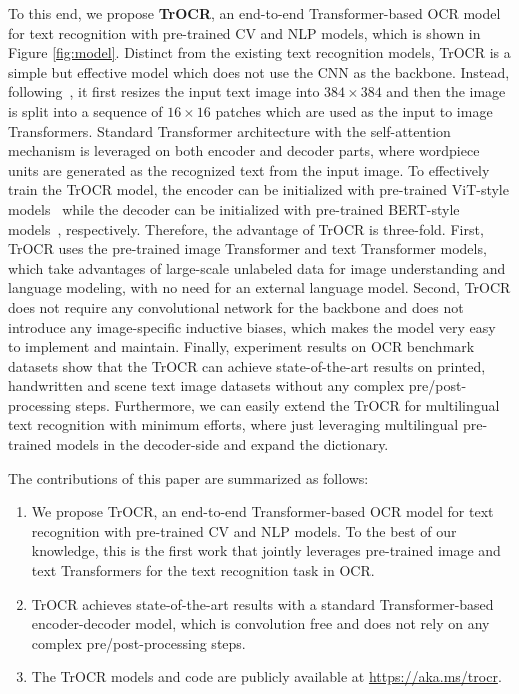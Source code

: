 \documentclass[letterpaper]{article} \usepackage{aaai23}  \usepackage{times}  \usepackage{helvet}  \usepackage{courier}  \usepackage[hyphens]{url}  \usepackage{graphicx} \urlstyle{rm} \def\UrlFont{\rm}  \usepackage{natbib}  \usepackage{caption} \frenchspacing  \setlength{\pdfpagewidth}{8.5in} \setlength{\pdfpageheight}{11in} \usepackage{algorithm}
\begin{document}
To this end, we propose \textbf{TrOCR}, an end-to-end Transformer-based OCR model for text recognition with pre-trained CV and NLP models, which is shown in Figure \ref{fig:model}. Distinct from the existing text recognition models, TrOCR is a simple but effective model which does not use the CNN as the backbone. Instead, following~\citep{dosovitskiy2020vit}, it first resizes the input text image into $384\times384$ and then the image is split into a sequence of $16\times16$ patches which are used as the input to image Transformers. Standard Transformer architecture with the self-attention mechanism is leveraged on both encoder and decoder parts, where wordpiece units are generated as the recognized text from the input image. To effectively train the TrOCR model, the encoder can be initialized with pre-trained ViT-style models~\citep{dosovitskiy2020vit,touvron2020deit,bao2021beit} while the decoder can be initialized with pre-trained BERT-style models~\citep{devlin2019bert,liu2019roberta,dong2019unified, wang2020minilm}, respectively. Therefore, the advantage of TrOCR is three-fold. First, TrOCR uses the pre-trained image Transformer and text Transformer models, which take advantages of large-scale unlabeled data for image understanding and language modeling, with no need for an external language model. Second, TrOCR does not require any convolutional network for the backbone and does not introduce any image-specific inductive biases, which makes the model very easy to implement and maintain. Finally, experiment results on OCR benchmark datasets show that the TrOCR can achieve state-of-the-art results on printed, handwritten and scene text image datasets without any complex pre/post-processing steps. Furthermore, we can easily extend the TrOCR for multilingual text recognition with minimum efforts, where just leveraging multilingual pre-trained models in the decoder-side and expand the dictionary.

The contributions of this paper are summarized as follows:
\begin{enumerate}
    \item We propose TrOCR, an end-to-end Transformer-based OCR model for text recognition with pre-trained CV and NLP models. To the best of our knowledge, this is the first work that jointly leverages pre-trained image and text Transformers for the text recognition task in OCR. 
    \item TrOCR achieves state-of-the-art results with a standard Transformer-based encoder-decoder model, which is convolution free and does not rely on any complex pre/post-processing steps.
    \item The TrOCR models and code are publicly available at \url{https://aka.ms/trocr}.
\end{enumerate}
\end{document}
